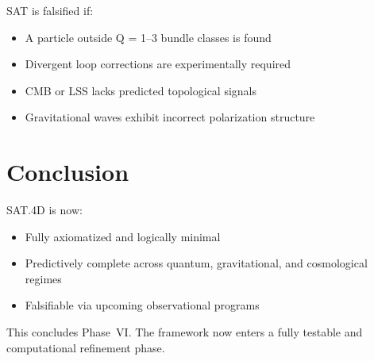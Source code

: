 \documentclass[11pt]{article}
\begin{document}
SAT is falsified if:
\begin{itemize}
  \item A particle outside Q = 1--3 bundle classes is found
  \item Divergent loop corrections are experimentally required
  \item CMB or LSS lacks predicted topological signals
  \item Gravitational waves exhibit incorrect polarization structure
\end{itemize}

\section{Conclusion}

SAT.4D is now:
\begin{itemize}
  \item Fully axiomatized and logically minimal
  \item Predictively complete across quantum, gravitational, and cosmological regimes
  \item Falsifiable via upcoming observational programs
\end{itemize}

This concludes Phase~VI. The framework now enters a fully testable and computational refinement phase.
\end{document}
